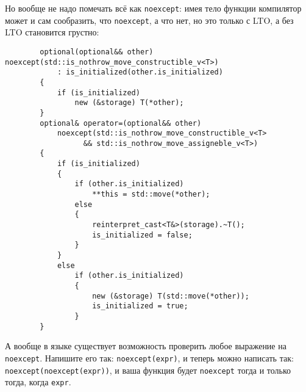 \documentclass{article}
\begin{document}
    Но вообще не надо помечать всё как \texttt{noexcept}: имея тело функции компилятор может и сам сообразить, что \texttt{noexcept}, а что нет, но это только с LTO, а без LTO становится грустно:
    \pagebreak
    \begin{verbatim}
        optional(optional&& other) noexcept(std::is_nothrow_move_constructible_v<T>)
            : is_initialized(other.is_initialized)
        {
            if (is_initialized)
                new (&storage) T(*other);
        }
        optional& operator=(optional&& other)
            noexcept(std::is_nothrow_move_constructible_v<T>
                  && std::is_nothrow_move_assigneble_v<T>)
        {
            if (is_initialized)
            {
                if (other.is_initialized)
                    **this = std::move(*other);
                else
                {
                    reinterpret_cast<T&>(storage).~T();
                    is_initialized = false;
                }
            }
            else
                if (other.is_initialized)
                {
                    new (&storage) T(std::move(*other));
                    is_initialized = true;
                }
        }
    \end{verbatim}
    А вообще в языке существует возможность проверить любое выражение на \texttt{noexcept}. Напишите его так: \texttt{noexcept(expr)}, и теперь можно написать так: \texttt{noexcept(noexcept(expr))}, и ваша функция будет \texttt{noexcept} тогда и только тогда, когда \texttt{expr}.
\end{document}

